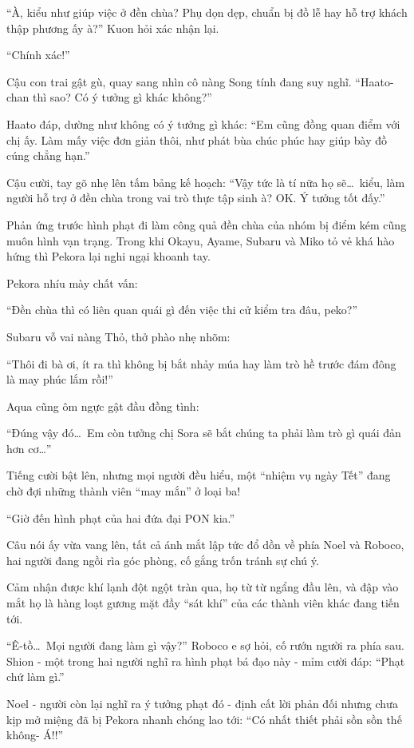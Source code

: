 \documentclass[../main.tex]{subfiles}
\begin{document}
``À, kiểu như giúp việc ở đền chùa? Phụ dọn dẹp, chuẩn bị đồ lễ hay hỗ trợ khách thập phương ấy à?'' Kuon hỏi xác nhận lại.

``Chính xác!''

Cậu con trai gật gù, quay sang nhìn cô nàng Song tính đang suy nghĩ. ``Haato-chan thì sao? Có ý tưởng gì khác không?''

Haato đáp, dường như không có ý tưởng gì khác: ``Em cũng đồng quan điểm với chị ấy. Làm mấy việc đơn giản thôi, như phát bùa chúc phúc hay giúp bày đồ cúng chẳng hạn.''

Cậu cười, tay gõ nhẹ lên tấm bảng kế hoạch: ``Vậy tức là tí nữa họ sẽ\dots\ kiểu, làm người hỗ trợ ở đền chùa trong vai trò thực tập sinh à? OK. Ý tưởng tốt đấy.''

Phản ứng trước hình phạt đi làm công quả đền chùa của nhóm bị điểm kém cũng muôn hình vạn trạng. Trong khi Okayu, Ayame, Subaru và Miko tỏ vẻ khá hào hứng thì Pekora lại nghi ngại khoanh tay.

Pekora nhíu mày chất vấn:

``Đền chùa thì có liên quan quái gì đến việc thi cử kiểm tra đâu, peko?''

Subaru vỗ vai nàng Thỏ, thở phào nhẹ nhõm:

``Thôi đi bà ơi, ít ra thì không bị bắt nhảy múa hay làm trò hề trước đám đông là may phúc lắm rồi!''

Aqua cũng ôm ngực gật đầu đồng tình:

``Đúng vậy đó\dots\ Em còn tưởng chị Sora sẽ bắt chúng ta phải làm trò gì quái đản hơn cơ\dots''

Tiếng cười bật lên, nhưng mọi người đều hiểu, một ``nhiệm vụ ngày Tết'' đang chờ đợi những thành viên ``may mắn'' ở loại ba!

``Giờ đến hình phạt của hai đứa đại PON kia.''

Câu nói ấy vừa vang lên, tất cả ánh mắt lập tức đổ dồn về phía Noel và Roboco, hai người đang ngồi rìa góc phòng, cố gắng trốn tránh sự chú ý.

Cảm nhận được khí lạnh đột ngột tràn qua, họ từ từ ngẩng đầu lên, và đập vào mắt họ là hàng loạt gương mặt đầy ``sát khí'' của các thành viên khác đang tiến tới.

``Ê-tồ\dots\ Mọi người đang làm gì vậy?'' Roboco e sợ hỏi, cố rướn người ra phía sau. Shion - một trong hai người nghĩ ra hình phạt bá đạo này - mỉm cười đáp: ``Phạt chứ làm gì.''

Noel - người còn lại nghĩ ra ý tưởng phạt đó - định cất lời phản đối nhưng chưa kịp mở miệng đã bị Pekora nhanh chóng lao tới: ``Có nhất thiết phải sồn sồn thế không- Á!!''
\end{document}
